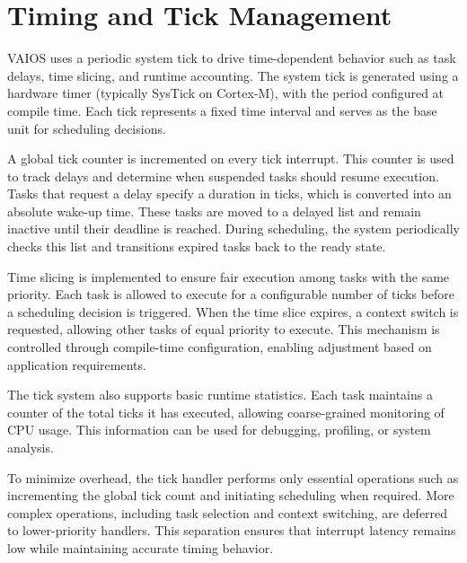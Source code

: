 \section{Timing and Tick Management}
\label{sec:vaios_timing}

VAIOS uses a periodic system tick to drive time-dependent behavior such as task delays, time slicing, and runtime accounting. The system tick is generated using a hardware timer (typically SysTick on Cortex-M), with the period configured at compile time. Each tick represents a fixed time interval and serves as the base unit for scheduling decisions.

A global tick counter is incremented on every tick interrupt. This counter is used to track delays and determine when suspended tasks should resume execution. Tasks that request a delay specify a duration in ticks, which is converted into an absolute wake-up time. These tasks are moved to a delayed list and remain inactive until their deadline is reached. During scheduling, the system periodically checks this list and transitions expired tasks back to the ready state.

Time slicing is implemented to ensure fair execution among tasks with the same priority. Each task is allowed to execute for a configurable number of ticks before a scheduling decision is triggered. When the time slice expires, a context switch is requested, allowing other tasks of equal priority to execute. This mechanism is controlled through compile-time configuration, enabling adjustment based on application requirements.

The tick system also supports basic runtime statistics. Each task maintains a counter of the total ticks it has executed, allowing coarse-grained monitoring of CPU usage. This information can be used for debugging, profiling, or system analysis.

To minimize overhead, the tick handler performs only essential operations such as incrementing the global tick count and initiating scheduling when required. More complex operations, including task selection and context switching, are deferred to lower-priority handlers. This separation ensures that interrupt latency remains low while maintaining accurate timing behavior.
